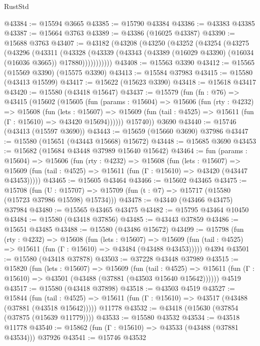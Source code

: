 \begin{lexlean}{RustStd}
\begin{coremodule}
@43384 := @15594 @3665
@43385 := @15790 @43384
@43386 := @43383 @43385
@43387 := @15664 @3763
@43389 := @43386 (@16025 @43387)
@43390 := @15688 @3763
@43407 := @43182
    (@43208
      (@43250
        (@43252
          (@43254
            (@43275
              (@43296
                (@43311
                  (@43328
                    (@43339
                      (@43343 (@43389 (@16029 @43390) (@16034 (@16036 @3665)) @17880)))))))))))
@43408 := @15563 @3390
@43412 := @15565 (@15569 @3390) (@15575 @3390)
@43413 := @15584 @37983
@43415 := @15580 (@43413 @15599)
@43417 := @15622 (@15623 @3390)
@43418 := @15618 @43417
@43420 := @15580 (@43418 @15647)
@43437 := @15579
    (fun (fn : @76) =>
    @43415
      (@15602
        (@15605
          (fun (params : @15604) =>
          @15606
            (fun (rty : @4232) =>
            @15608
              (fun (lets : @15607) =>
              @15609 (fun (tail : @4525) => @15611 (fun (Γ : @15610) => @43420 @15694))))))
        @15740))
    @3690
@43440 := @15746 (@43413 (@15597 @3690))
@43443 := @15659 (@15660 @3690) @37986
@43447 := @15580 (@15651 (@43443 @15668) @15672)
@43448 := @15685 @3690
@43453 := @15682 (@15684 @43448 @37989 @15640 @15642)
@43464 := fun (params : @15604) =>
  @15606
    (fun (rty : @4232) =>
    @15608
      (fun (lets : @15607) =>
      @15609 (fun (tail : @4525) => @15611 (fun (Γ : @15610) => @43420 (@43447 @43453)))))
@43465 := @15605 @43464
@43466 := @15602 @43465
@43475 := @15708
    (fun (U : @15707) => @15709 (fun (t : @7) => @15717 (@15580 (@15723 @37986 @15598) @15734)))
@43478 := @43440 (@43466 @43475) @37984
@43480 := @15565 @43465 @43475
@43482 := @15795 @43464 @10450
@43484 := @15580 (@43418 @37856)
@43485 := @43443 @37859
@43486 := @15651 @43485
@43488 := @15580 (@43486 @15672)
@43499 := @15798
    (fun (rty : @4232) =>
    @15608
      (fun (lets : @15607) =>
      @15609 (fun (tail : @4525) => @15611 (fun (Γ : @15610) => @43484 (@43488 @43453)))))
    @4394
@43501 := @15580 (@43418 @37878)
@43503 := @37228 @43448 @37989
@43515 := @15820
    (fun (lets : @15607) =>
    @15609
      (fun (tail : @4525) =>
      @15611 (fun (Γ : @15610) => @43501 (@43488 (@37881 (@43503 @15640 @15642))))))
    @4519
@43517 := @15580 (@43418 @37898)
@43518 := @43503 @4519
@43527 := @15844
    (fun (tail : @4525) => @15611 (fun (Γ : @15610) => @43517 (@43488 (@37881 (@43518 @15642)))))
    @11778
@43532 := @43418 (@15630 (@37854 (@37875 (@15639 @11779))))
@43533 := @15580 @43532
@43534 := @43518 @11778
@43540 := @15862 (fun (Γ : @15610) => @43533 (@43488 (@37881 @43534))) @37926
@43541 := @15746 @43532

\end{coremodule}
\end{lexlean}
